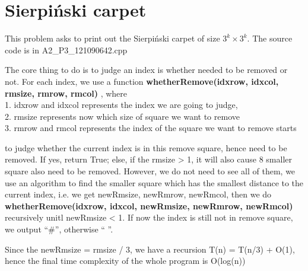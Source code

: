 \section{Sierpiński carpet}
This problem asks to print out the Sierpiński carpet of size $3
^k \times 3^k$. The source code is in A2\_P3\_121090642.cpp

The core thing to do is to judge an index is whether needed to be removed or not. For each index, we use a function \textbf{whetherRemove(idxrow, idxcol,  rmsize, rmrow, rmcol) }, where
~\\
1. idxrow and idxcol represents the index we are going to judge,
~\\
2. rmsize represents now which size of square we want to remove
~\\
3. rmrow and rmcol represents the index of the square we want to remove starts

to judge whether the current index is in this remove square, hence need to be removed. If yes, return True; else, if the rmsize > 1, it will also cause 8 smaller square also need to be removed. However, we do not need to see all of them, we use an algorithm to find the smaller square which has the smallest distance to the current index, i.e. we get newRmsize, newRmrow, newRmcol, then we do \textbf{whetherRemove(idxrow, idxcol, newRmsize, newRmrow, newRmcol) } recursively unitl newRmsize < 1. If now the index is still not in remove square, we output “$\#$”, otherwise “ ”. 

Since the newRmsize = rmsize / 3, we have a recursion T(n) = T(n/3) + O(1), hence the final time complexity of the whole program is O(log(n))